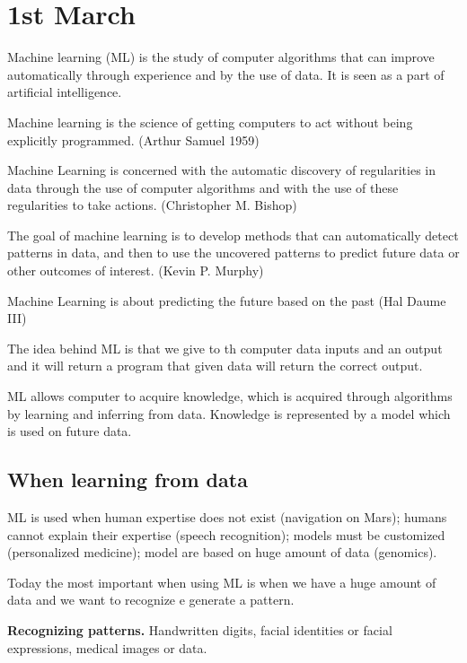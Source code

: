 \documentclass{article}
\begin{document}
	
\section*{1st March}

Machine learning (ML) is the study of computer algorithms that can improve automatically through experience and by the use of data. It is seen as a part of artificial intelligence.
	
\bigskip

Machine learning is the science of getting computers to act without being explicitly programmed. (Arthur Samuel 1959)
	
\bigskip

Machine Learning is concerned with the automatic discovery of regularities in data through the use of computer algorithms and with the use of these regularities to take actions. (Christopher M. Bishop)

\bigskip

The goal of machine learning is to develop methods that can automatically detect patterns in data, and then to use the uncovered patterns to predict future data or other outcomes of interest. (Kevin P. Murphy)

\bigskip


Machine Learning is about predicting the future based on the past (Hal Daume III)


\bigskip

	
The idea behind ML is that we give to th computer data inputs and an output and it will return a program that given data will return the correct output.


\bigskip

ML allows computer to acquire knowledge, which is acquired through algorithms by learning and inferring from data. Knowledge is represented by a model which is used on future data.


\subsection*{When learning from data}
ML is used when human expertise does not exist (navigation on Mars); humans cannot explain their expertise (speech recognition); models must be customized (personalized medicine); model are based on huge amount of data (genomics).

Today the most important when using ML is when we have a huge amount of data and we want to recognize e generate a pattern.


\textbf{Recognizing patterns. }Handwritten digits, facial identities or facial expressions, medical images or data.
\end{document}
